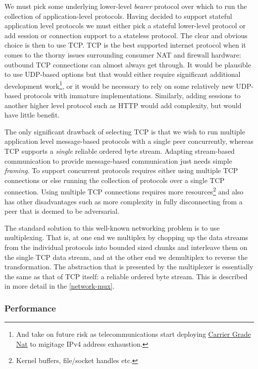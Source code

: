 \documentclass[11pt,a4paper]{article}
\begin{document}
We must pick some underlying lower-level \emph{bearer} protocol over
which to run the collection of application-level protocols. Having
decided to support stateful application level protocols we must either
pick a stateful lower-level protocol or add session or connection
support to a stateless protocol. The clear and obvious choice is then to
use TCP. TCP is the best supported internet protocol when it comes to
the thorny issues surrounding consumer NAT and firewall hardware:
outbound TCP connections can almost always get through. It would be
plausible to use UDP-based options but that would either require
significant additional development work\footnote{And take on future risk
  as telecommunications start deploying
  \href{https://en.wikipedia.org/wiki/Carrier-grade_NAT}{{Carrier Grade
  Nat}} to migitage IPv4 address exhaustion.}, or it would be necessary
to rely on some relatively new UDP-based protocols with immature
implementations. Similarly, adding sessions to another higher level
protocol such as HTTP would add complexity, but would have little
benefit.

The only significant drawback of selecting TCP is that we wish to run
multiple application level message-based protocols with a single peer
concurrently, whereas TCP supports a \emph{single} reliable ordered byte
stream. Adapting stream-based communication to provide message-based
communication just needs simple \emph{framing}. To support concurrent
protocols requires either using multiple TCP connections or else running
the collection of protocols over a single TCP connection. Using multiple
TCP connections requires more resources\footnote{Kernel buffers,
  file/socket handles etc.} and also has other disadvantages such as
more complexity in fully disconnecting from a peer that is deemed to be
adversarial.

The standard solution to this well-known networking problem is to use
multiplexing. That is, at one end we multiplex by chopping up the data
streams from the individual protocols into bounded sized chunks and
interleave them on the single TCP data stream, and at the other end we
demultiplex to reverse the transformation. The abstraction that is
presented by the multiplexer is essentially the same as that of TCP
itself: a reliable ordered byte stream. This is described in more detail
in the \cref{network-mux}.

\subsubsection{Performance}
\label{performance}
\end{document}
